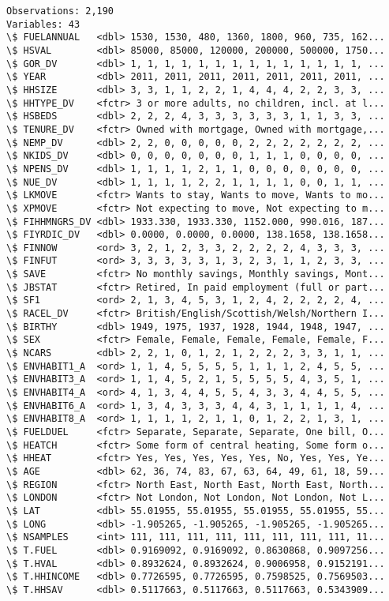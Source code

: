 \documentclass[12pt]{article}
\begin{document}
\begin{Answer}
\begin{verbatim}
Observations: 2,190
Variables: 43
\$ FUELANNUAL   <dbl> 1530, 1530, 480, 1360, 1800, 960, 735, 162...
\$ HSVAL        <dbl> 85000, 85000, 120000, 200000, 500000, 1750...
\$ GOR_DV       <dbl> 1, 1, 1, 1, 1, 1, 1, 1, 1, 1, 1, 1, 1, 1, ...
\$ YEAR         <dbl> 2011, 2011, 2011, 2011, 2011, 2011, 2011, ...
\$ HHSIZE       <dbl> 3, 3, 1, 1, 2, 2, 1, 4, 4, 4, 2, 2, 3, 3, ...
\$ HHTYPE_DV    <fctr> 3 or more adults, no children, incl. at l...
\$ HSBEDS       <dbl> 2, 2, 2, 4, 3, 3, 3, 3, 3, 3, 1, 1, 3, 3, ...
\$ TENURE_DV    <fctr> Owned with mortgage, Owned with mortgage,...
\$ NEMP_DV      <dbl> 2, 2, 0, 0, 0, 0, 0, 2, 2, 2, 2, 2, 2, 2, ...
\$ NKIDS_DV     <dbl> 0, 0, 0, 0, 0, 0, 0, 1, 1, 1, 0, 0, 0, 0, ...
\$ NPENS_DV     <dbl> 1, 1, 1, 1, 2, 1, 1, 0, 0, 0, 0, 0, 0, 0, ...
\$ NUE_DV       <dbl> 1, 1, 1, 1, 2, 2, 1, 1, 1, 1, 0, 0, 1, 1, ...
\$ LKMOVE       <fctr> Wants to stay, Wants to move, Wants to mo...
\$ XPMOVE       <fctr> Not expecting to move, Not expecting to m...
\$ FIHHMNGRS_DV <dbl> 1933.330, 1933.330, 1152.000, 990.016, 187...
\$ FIYRDIC_DV   <dbl> 0.0000, 0.0000, 0.0000, 138.1658, 138.1658...
\$ FINNOW       <ord> 3, 2, 1, 2, 3, 3, 2, 2, 2, 2, 4, 3, 3, 3, ...
\$ FINFUT       <ord> 3, 3, 3, 3, 3, 1, 3, 2, 3, 1, 1, 2, 3, 3, ...
\$ SAVE         <fctr> No monthly savings, Monthly savings, Mont...
\$ JBSTAT       <fctr> Retired, In paid employment (full or part...
\$ SF1          <ord> 2, 1, 3, 4, 5, 3, 1, 2, 4, 2, 2, 2, 2, 4, ...
\$ RACEL_DV     <fctr> British/English/Scottish/Welsh/Northern I...
\$ BIRTHY       <dbl> 1949, 1975, 1937, 1928, 1944, 1948, 1947, ...
\$ SEX          <fctr> Female, Female, Female, Female, Female, F...
\$ NCARS        <dbl> 2, 2, 1, 0, 1, 2, 1, 2, 2, 2, 3, 3, 1, 1, ...
\$ ENVHABIT1_A  <ord> 1, 1, 4, 5, 5, 5, 5, 1, 1, 1, 2, 4, 5, 5, ...
\$ ENVHABIT3_A  <ord> 1, 1, 4, 5, 2, 1, 5, 5, 5, 5, 4, 3, 5, 1, ...
\$ ENVHABIT4_A  <ord> 4, 1, 3, 4, 4, 5, 5, 4, 3, 3, 4, 4, 5, 5, ...
\$ ENVHABIT6_A  <ord> 1, 3, 4, 3, 3, 3, 4, 4, 3, 1, 1, 1, 1, 4, ...
\$ ENVHABIT8_A  <ord> 1, 1, 1, 1, 2, 1, 1, 0, 1, 2, 2, 1, 3, 1, ...
\$ FUELDUEL     <fctr> Separate, Separate, Separate, One bill, O...
\$ HEATCH       <fctr> Some form of central heating, Some form o...
\$ HHEAT        <fctr> Yes, Yes, Yes, Yes, Yes, No, Yes, Yes, Ye...
\$ AGE          <dbl> 62, 36, 74, 83, 67, 63, 64, 49, 61, 18, 59...
\$ REGION       <fctr> North East, North East, North East, North...
\$ LONDON       <fctr> Not London, Not London, Not London, Not L...
\$ LAT          <dbl> 55.01955, 55.01955, 55.01955, 55.01955, 55...
\$ LONG         <dbl> -1.905265, -1.905265, -1.905265, -1.905265...
\$ NSAMPLES     <int> 111, 111, 111, 111, 111, 111, 111, 111, 11...
\$ T.FUEL       <dbl> 0.9169092, 0.9169092, 0.8630868, 0.9097256...
\$ T.HVAL       <dbl> 0.8932624, 0.8932624, 0.9006958, 0.9152191...
\$ T.HHINCOME   <dbl> 0.7726595, 0.7726595, 0.7598525, 0.7569503...
\$ T.HHSAV      <dbl> 0.5117663, 0.5117663, 0.5117663, 0.5343909...
\end{verbatim}
\end{Answer}
\end{document}
